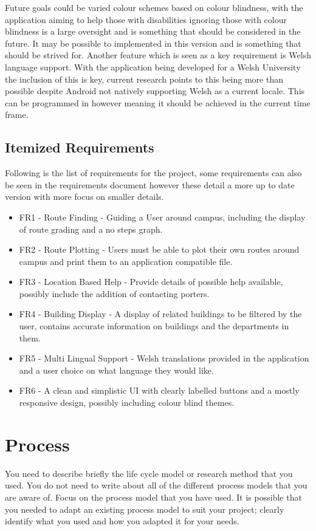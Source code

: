 Future goals could be varied colour schemes based on colour blindness, with the application aiming to help those with disabilities ignoring those with colour blindness is a large oversight and is something that should be considered in the future. It may be possible to implemented in this version and is something that should be strived for. Another feature which is seen as a key requirement is Welsh language support. With the application being developed for a Welsh University the inclusion of this is key, current research points to this being more than possible despite Android not natively supporting Welsh as a current locale. This can be programmed in however meaning it should be achieved in the current time frame. 
\subsection{Itemized Requirements}
Following is the list of requirements for the project, some requirements can also be seen in the requirements document however these detail a more up to date version with more focus on smaller details.

\begin{itemize}
	\item FR1 - Route Finding - Guiding a User around campus, including the display of route grading and a no steps graph.
	\item FR2 - Route Plotting - Users must be able to plot their own routes around campus and print them to an application compatible file.
	\item FR3 - Location Based Help - Provide details of possible help available, possibly include the addition of contacting porters. 
	\item FR4 - Building Display - A display of related buildings to be filtered by the user, contains accurate information on buildings and the departments in them. 
	\item FR5 - Multi Lingual Support - Welsh translations provided in the application and a user choice on what language they would like. 
	\item FR6 - A clean and simplistic UI with clearly labelled buttons and a mostly responsive design, possibly including colour blind themes.
\end{itemize}
\section{Process}
You need to describe briefly the life cycle model or research method that you used. You do not need to write about all of the different process models that you are aware of. Focus on the process model that you have used. It is possible that you needed to adapt an existing process model to suit your project; clearly identify what you used and how you adapted it for your needs.


